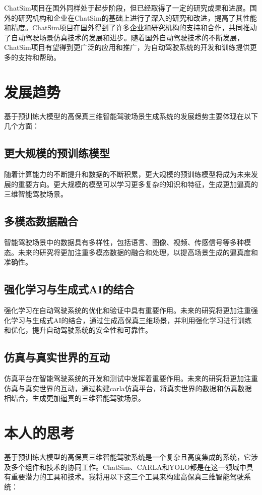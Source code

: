 \documentclass{article}
\begin{document}
ChatSim项目在国外同样处于起步阶段，但已经取得了一定的研究成果和进展。国外的研究机构和企业在ChatSim的基础上进行了深入的研究和改进，提高了其性能和精度。ChatSim项目在国外得到了许多企业和研究机构的支持和合作，共同推动了自动驾驶场景仿真技术的发展和进步。随着国外自动驾驶技术的不断发展，ChatSim项目有望得到更广泛的应用和推广，为自动驾驶系统的开发和训练提供更多的支持和帮助。

\section*{发展趋势}
基于预训练大模型的高保真三维智能驾驶场景生成系统的发展趋势主要体现在以下几个方面：

\subsection*{更大规模的预训练模型}
随着计算能力的不断提升和数据的不断积累，更大规模的预训练模型将成为未来发展的重要方向。更大规模的模型可以学习更多复杂的知识和特征，生成更加逼真的三维智能驾驶场景。

\subsection*{多模态数据融合}
智能驾驶场景中的数据具有多样性，包括语言、图像、视频、传感信号等多种模态。未来的研究将更加注重多模态数据的融合和处理，以提高场景生成的逼真度和准确性。

\subsection*{强化学习与生成式AI的结合}
强化学习在自动驾驶系统的优化和验证中具有重要作用。未来的研究将更加注重强化学习与生成式AI的结合，通过生成高保真三维场景，并利用强化学习进行训练和优化，提升自动驾驶系统的安全性和可靠性。

\subsection*{仿真与真实世界的互动}
仿真平台在智能驾驶系统的开发和测试中发挥着重要作用。未来的研究将更加注重仿真与真实世界的互动，通过构建carla仿真平台，将真实世界的数据和仿真数据相结合，生成更加逼真的三维智能驾驶场景。

\section*{本人的思考}
基于预训练大模型的高保真三维智能驾驶系统是一个复杂且高度集成的系统，它涉及多个组件和技术的协同工作。ChatSim、CARLA和YOLO都是在这一领域中具有重要潜力的工具和技术。我将用以下这三个工具来构建高保真三维智能驾驶系统：
\end{document}

